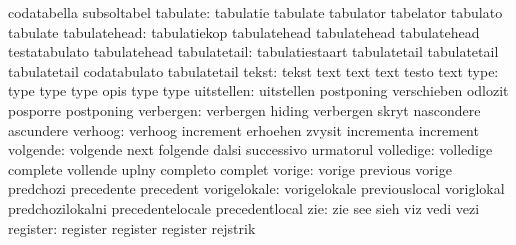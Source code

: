                            codatabella               subsoltabel
                 tabulate: tabulatie                 tabulate
                           tabulator                 tabelator
                           tabulato                  tabulate
             tabulatehead: tabulatiekop              tabulatehead
                           tabulatehead              tabulatehead
                           testatabulato             tabulatehead %
             tabulatetail: tabulatiestaart           tabulatetail
                           tabulatetail              tabulatetail
                           codatabulato              tabulatetail %
                    tekst: tekst                     text
                           text                      text
                           testo                     text
                     type: type                      type
                           type                      opis
                           type                      type %
               uitstellen: uitstellen                postponing
                           verschieben               odlozit
                           posporre                  postponing %
                verbergen: verbergen                 hiding
                           verbergen                 skryt
                           nascondere                ascundere
                  verhoog: verhoog                   increment
                           erhoehen                  zvysit
                           incrementa                increment
                 volgende: volgende                  next
                           folgende                  dalsi
                           successivo                urmatorul
                volledige: volledige                 complete
                           vollende                  uplny
                           completo                  complet
                   vorige: vorige                    previous
                           vorige                    predchozi
                           precedente                precedent
             vorigelokale: vorigelokale              previouslocal
                           voriglokal                predchozilokalni
                           precedentelocale          precedentlocal
                      zie: zie                       see
                           sieh                      viz
                           vedi                      vezi
                 register: register                  register
                           register                  rejstrik
